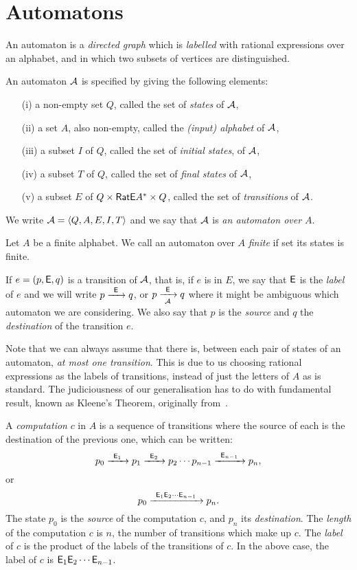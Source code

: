 \section{Automatons}

An automaton is a \emph{directed graph} which is \emph{labelled} with rational expressions over an alphabet, and in which two subsets of vertices are distinguished.

\begin{defn}
    An automaton ${\mathcal{A}}$ is specified by giving the following elements:
    \begin{itemize}
        \item[(i)] a non-empty set $Q$, called the set of \emph{states} of ${\mathcal{A}}$,
        \item[(ii)] a set $A$, also non-empty, called the \emph{(input) alphabet} of ${\mathcal{A}}$,
        \item[(iii)] a subset $I$ of $Q$, called the set of \emph{initial states}, of ${\mathcal{A}}$,
        \item[(iv)] a subset $T$ of $Q$, called the set of \emph{final states} of ${\mathcal{A}}$,
        \item[(v)] a subset $E$ of $Q \times {\mathsf{RatE}} A^* \times Q$, called the set of \emph{transitions} of ${\mathcal{A}}$.
    \end{itemize}
    We write ${\mathcal{A}} = \langle Q, A, E, I, T \rangle$ and we say that ${\mathcal{A}}$ is \emph{an automaton over $A$}.
\end{defn}

Let $A$ be a finite alphabet. We call an automaton over $A$ \emph{finite} if set its states is finite.

If $e = (p, {\mathsf{E}}, q)$ is a transition of ${\mathcal{A}}$, that is, if $e$ is in $E$, we say that ${\mathsf{E}}$ is the \emph{label} of $e$ and we will write $p {\; \xrightarrow[]{\: \; {\mathsf{E}} \: \;} \;} q$, or $p {\; \xrightarrow[{\mathcal{A}}]{\: \; {\mathsf{E}} \: \;} \;} q$ where it might be ambiguous which automaton we are considering. We also say that $p$ is the \emph{source} and $q$ the \emph{destination} of the transition $e$.

Note that we can always assume that there is, between each pair of states of an automaton, \emph{at most one transition}. This is due to us choosing rational expressions as the labels of transitions, instead of just the letters of $A$ as is standard. The judiciousness of our generalisation has to do with fundamental result, known as Kleene’s Theorem, originally from~\cite{Kleene56}.

A \emph{computation} $c$ in $A$ is a sequence of transitions where the source of each is the destination of the previous one, which can be written:
\[
    p_0 {\; \xrightarrow[]{\: \; {\mathsf{E}}_1 \: \;} \;} p_1 {\; \xrightarrow[]{\: \; {\mathsf{E}}_2 \: \;} \;} p_2 \dotsm p_{n-1} {\; \xrightarrow[]{\: \; {\mathsf{E}}_{n-1} \: \;} \;} p_n,
\]
or
\[
    p_0 {\; \xrightarrow[]{\: \; {\mathsf{E}}_1 {\mathsf{E}}_2 \dotsm {\mathsf{E}}_{n-1} \: \;} \;} p_n.
\]
The state $p_0$ is the \emph{source} of the computation $c$, and $p_n$ its \emph{destination}. The \emph{length} of the computation $c$ is $n$, the number of transitions which make up $c$. The \emph{label} of $c$ is the product of the labels of the transitions of $c$. In the above case, the label of $c$ is ${\mathsf{E}}_1 {\mathsf{E}}_2 \dotsm {\mathsf{E}}_{n-1}$.

